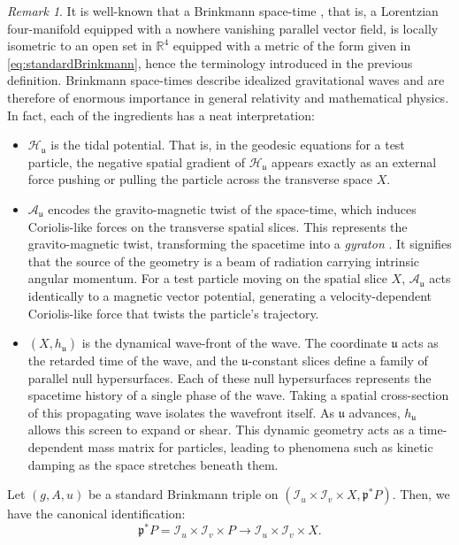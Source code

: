 \documentclass[10pt,a4paper,twoside,reqno]{amsart}
\theoremstyle{plain}
\theoremstyle{definition}
\theoremstyle{remark}
\newtheorem{remark}[thm]{Remark}
\def\cA{\mathcal{A}}
\def\cI{\mathcal{I}}
\def\fru{\mathfrak{u}}
\begin{document}
\begin{remark}
It is well-known that a Brinkmann space-time \cite{brinkmann1925einstein}, that is, a Lorentzian four-manifold equipped with a nowhere vanishing parallel vector field, is locally isometric to an open set in $\mathbb{R}^4$ equipped with a metric of the form given in \eqref{eq:standardBrinkmann}, hence the terminology introduced in the previous definition. Brinkmann space-times describe idealized gravitational waves and are therefore of enormous importance in general relativity and mathematical physics. In fact, each of the ingredients has a neat interpretation:
\begin{itemize}
\item $\mathcal{H}_{\fru}$ is the tidal potential. That is, in the geodesic equations for a test particle, the negative spatial gradient of $\mathcal{H}_{\fru}$ appears exactly as an external force pushing or pulling the particle across the transverse space $X$.

\item $\cA_{\fru}$ encodes the gravito-magnetic twist of the space-time, which induces Coriolis-like forces on the transverse spatial slices. This represents the gravito-magnetic twist, transforming the spacetime into a \emph{gyraton} \cite{Frolov:2005in}. It signifies that the source of the geometry is a beam of radiation carrying intrinsic angular momentum. For a test particle moving on the spatial slice $X$, $\mathcal{A}_{\fru}$ acts identically to a magnetic vector potential, generating a velocity-dependent Coriolis-like force that twists the particle's trajectory.

\item $(X,h_{\fru})$ is the dynamical wave-front of the wave. The coordinate $\fru$ acts as the retarded time of the wave, and the $ \fru$-constant slices define a family of parallel null hypersurfaces. Each of these null hypersurfaces represents the spacetime history of a single phase of the wave. Taking a spatial cross-section of this propagating wave isolates the wavefront itself. As $\fru$ advances, $h_{\fru}$ allows this screen to expand or shear. This dynamic geometry acts as a time-dependent mass matrix for particles, leading to phenomena such as kinetic damping as the space stretches beneath them.
\end{itemize}
\end{remark}

\noindent 
Let $(g,A,u)$ be a standard Brinkmann triple on $(\cI_u\times \cI_v\times X , \mathfrak{p}^{\ast}P)$. Then, we have the canonical identification:
\begin{equation*}
\mathfrak{p}^{\ast}P = \cI_u\times \cI_v \times P \to \cI_u\times \cI_v \times X.
\end{equation*}
\end{document}
